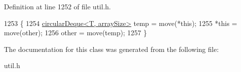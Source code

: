 Definition at line 1252 of file util.\+h.


\begin{DoxyCode}
1253         \{
1254             \hyperlink{classcircularDeque}{circularDeque<T, arraySize>} temp = move(*\textcolor{keyword}{this});
1255             *\textcolor{keyword}{this} = move(other);
1256             other = move(temp);
1257         \}
\end{DoxyCode}


The documentation for this class was generated from the following file\+:\begin{DoxyCompactItemize}
\item 
util.\+h\end{DoxyCompactItemize}
